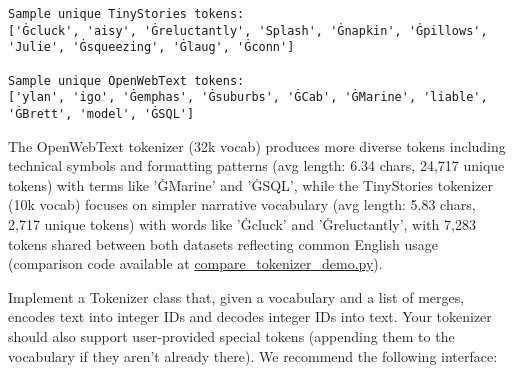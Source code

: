 \begin{enumerate}[label=(\alph*)]
\begin{lstlisting}
Sample unique TinyStories tokens:
['Ġcluck', 'aisy', 'Ġreluctantly', 'Splash', 'Ġnapkin', 'Ġpillows', 'Julie', 'Ġsqueezing', 'Ġlaug', 'Ġconn']

Sample unique OpenWebText tokens:
['ylan', 'igo', 'Ġemphas', 'Ġsuburbs', 'ĠCab', 'ĠMarine', 'liable', 'ĠBrett', 'model', 'ĠSQL']
    \end{lstlisting}
    \begin{answer}
    The OpenWebText tokenizer (32k vocab) produces more diverse tokens including technical symbols and formatting patterns (avg length: 6.34 chars, 24,717 unique tokens) with terms like 'ĠMarine' and 'ĠSQL', while the TinyStories tokenizer (10k vocab) focuses on simpler narrative vocabulary (avg length: 5.83 chars, 2,717 unique tokens) with words like 'Ġcluck' and 'Ġreluctantly', with 7,283 tokens shared between both datasets reflecting common English usage (comparison code available at \href{https://github.com/donglinkang2021/assignment1-basics/blob/main/data_utils/compare_tokenizer_demo.py}{compare\_tokenizer\_demo.py}).
    \end{answer}
\end{enumerate}



Implement a Tokenizer class that, given a vocabulary and a list of merges, encodes text into integer IDs and decodes integer IDs into text. Your tokenizer should also support user-provided special tokens (appending them to the vocabulary if they aren't already there). We recommend the following interface:

